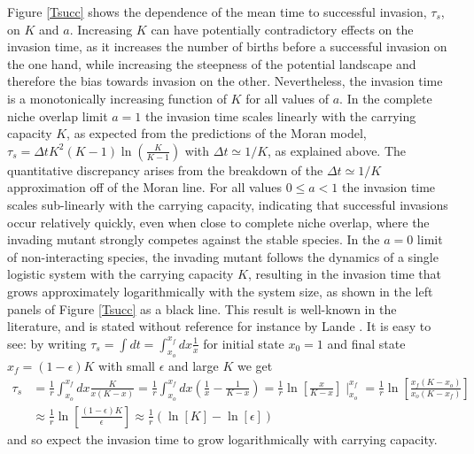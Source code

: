 Figure \ref{Tsucc} shows the dependence of the mean time to successful invasion, $\tau_s$, on $K$ and $a$. 
Increasing $K$ can have potentially contradictory effects on the invasion time, as it increases the number of births before a successful invasion on the one hand, while increasing the steepness of the potential landscape and therefore the bias towards invasion on the other. 
Nevertheless, the invasion time is a monotonically increasing function of $K$ for all values of $a$. In the complete niche overlap limit $a=1$ the invasion time scales linearly with the carrying capacity $K$, as expected from the predictions of the Moran model, $\tau_{s} = \Delta t K^2(K-1)\ln\left(\frac{K}{K-1}\right)$ with $\Delta t\simeq 1/K$, as explained above. %
The quantitative discrepancy arises from the breakdown of the $\Delta t\simeq 1/K$ approximation off of the Moran line. %
For all values $0\leq a<1$ the invasion time scales sub-linearly with the carrying capacity, indicating that successful invasions occur relatively quickly, even when close to complete niche overlap, where the invading mutant strongly competes against the stable species.
In the $a=0$ limit of non-interacting species, the invading mutant follows the dynamics of a single logistic system with the carrying capacity $K$, resulting in the invasion time that grows approximately logarithmically with the system size, as shown in the left panels of Figure \ref{Tsucc} as a black line. 
This result is well-known in the literature, and is stated without reference for instance by Lande \cite{Lande1993}. 
It is easy to see: by writing $\tau_s = \int dt = \int_{x_o}^{x_f} dx \frac{1}{\dot{x}}$ for initial state $x_0=1$ and final state $x_f=(1-\epsilon)K$ with small $\epsilon$ and large $K$ we get
\begin{align*}
\tau_s &= \frac{1}{r}\int_{x_o}^{x_f} dx \frac{K}{x(K-x)} = \frac{1}{r}\int_{x_o}^{x_f} dx \left(\frac{1}{x}-\frac{1}{K-x} \right) = \frac{1}{r}\ln\left[\frac{x}{K-x} \right]\mid_{x_o}^{x_f} = \frac{1}{r}\ln\left[\frac{x_f(K-x_o)}{x_o(K-x_f)} \right] \\
	   &\approx \frac{1}{r}\ln\left[\frac{(1-\epsilon)K}{\epsilon} \right] \approx \frac{1}{r}\left(\ln\left[K\right]-\ln\left[\epsilon\right]\right)
\end{align*}
and so expect the invasion time to grow logarithmically with carrying capacity. 

